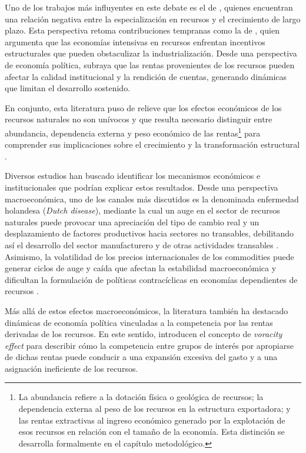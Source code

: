 \documentclass[../../PTFM.tex]{subfiles}
\begin{document}
	Uno de los trabajos más influyentes en este debate es el de \textcite{Sachs2001}, quienes encuentran una relación negativa entre la especialización en recursos y el crecimiento de largo plazo. Esta perspectiva retoma contribuciones tempranas como la de \textcite{Auty1993}, quien argumenta que las economías intensivas en recursos enfrentan incentivos estructurales que pueden obstaculizar la industrialización. Desde una perspectiva de economía política, \textcite{Ross1999} subraya que las rentas provenientes de los recursos pueden afectar la calidad institucional y la rendición de cuentas, generando dinámicas que limitan el desarrollo sostenido.

	En conjunto, esta literatura puso de relieve que los efectos económicos de los recursos naturales no son unívocos y que resulta necesario distinguir entre abundancia, dependencia externa y peso económico de las rentas\footnote{La abundancia refiere a la dotación física o geológica de recursos; la dependencia externa al peso de los recursos en la estructura exportadora; y las rentas extractivas al ingreso económico generado por la explotación de esos recursos en relación con el tamaño de la economía. Esta distinción se desarrolla formalmente en el capítulo metodológico.} para comprender sus implicaciones sobre el crecimiento y la transformación estructural \parencite{VanDerPloeg2011}.

	Diversos estudios han buscado identificar los mecanismos económicos e institucionales que podrían explicar estos resultados. Desde una perspectiva macroeconómica, uno de los canales más discutidos es la denominada enfermedad holandesa (\textit{Dutch disease}), mediante la cual un auge en el sector de recursos naturales puede provocar una apreciación del tipo de cambio real y un desplazamiento de factores productivos hacia sectores no transables, debilitando así el desarrollo del sector manufacturero y de otras actividades transables \parencite{Corden1982}. Asimismo, la volatilidad de los precios internacionales de los commodities puede generar ciclos de auge y caída que afectan la estabilidad macroeconómica y dificultan la formulación de políticas contracíclicas en economías dependientes de recursos \parencite{Anne2021}.

	Más allá de estos efectos macroeconómicos, la literatura también ha destacado dinámicas de economía política vinculadas a la competencia por las rentas derivadas de los recursos. En este sentido, \textcite{Tornell1999} introducen el concepto de \textit{voracity effect} para describir cómo la competencia entre grupos de interés por apropiarse de dichas rentas puede conducir a una expansión excesiva del gasto y a una asignación ineficiente de los recursos.
\end{document}
